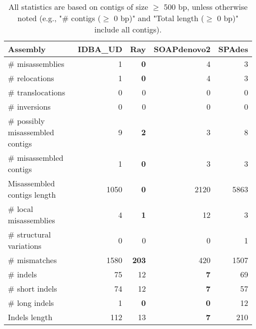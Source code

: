 \documentclass[12pt,a4paper]{article}
\begin{document}
\begin{table}[ht]
\begin{center}
\caption{All statistics are based on contigs of size $\geq$ 500 bp, unless otherwise noted (e.g., "\# contigs ($\geq$ 0 bp)" and "Total length ($\geq$ 0 bp)" include all contigs).}
\begin{tabular}{|l*{4}{|r}|}
\hline
Assembly & IDBA\_UD & Ray & SOAPdenovo2 & SPAdes \\ \hline
\# misassemblies & 1 & {\bf 0} & 4 & 3 \\ \hline
\hspace{5mm}\# relocations & 1 & {\bf 0} & 4 & 3 \\ \hline
\hspace{5mm}\# translocations & 0 & 0 & 0 & 0 \\ \hline
\hspace{5mm}\# inversions & 0 & 0 & 0 & 0 \\ \hline
\# possibly misassembled contigs & 9 & {\bf 2} & 3 & 8 \\ \hline
\# misassembled contigs & 1 & {\bf 0} & 3 & 3 \\ \hline
Misassembled contigs length & 1050 & {\bf 0} & 2120 & 5863 \\ \hline
\# local misassemblies & 4 & {\bf 1} & 12 & 3 \\ \hline
\# structural variations & 0 & 0 & 0 & 1 \\ \hline
\# mismatches & 1580 & {\bf 203} & 420 & 1507 \\ \hline
\# indels & 75 & 12 & {\bf 7} & 69 \\ \hline
\hspace{5mm}\# short indels & 74 & 12 & {\bf 7} & 57 \\ \hline
\hspace{5mm}\# long indels & 1 & {\bf 0} & {\bf 0} & 12 \\ \hline
Indels length & 112 & 13 & {\bf 7} & 210 \\ \hline
\end{tabular}
\end{center}
\end{table}
\end{document}
